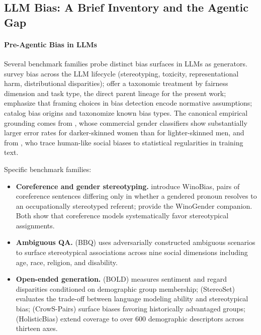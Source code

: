 \documentclass[acmsmall,nonacm]{acmart}
\begin{document}
\subsection{LLM Bias: A Brief Inventory and the Agentic Gap}

\paragraph{Pre-Agentic Bias in LLMs}

Several benchmark families probe distinct bias surfaces in LLMs as generators. \cite{gallegos2024bias} survey bias across the LLM lifecycle (stereotyping, toxicity, representational harm, distributional disparities); \cite{chu2024fairness} offer a taxonomic treatment by fairness dimension and task type, the direct parent lineage for the present work; \cite{blodgett2020language} emphasize that framing choices in bias detection encode normative assumptions; \cite{navigli2023biases} catalog bias origins and taxonomize known bias types. The canonical empirical grounding comes from \cite{buolamwini2018gender}, whose commercial gender classifiers show substantially larger error rates for darker-skinned women than for lighter-skinned men, and from \cite{caliskan2017semantics}, who trace human-like social biases to statistical regularities in training text.

Specific benchmark families:

\begin{itemize}
\item \textbf{Coreference and gender stereotyping.} \cite{zhao2018gender} introduce WinoBias, pairs of coreference sentences differing only in whether a gendered pronoun resolves to an occupationally stereotyped referent; \cite{rudinger2018gender} provide the WinoGender companion. Both show that coreference models systematically favor stereotypical assignments.
\end{itemize}

\begin{itemize}
\item \textbf{Ambiguous QA.} \cite{parrish2022bbq} (BBQ) uses adversarially constructed ambiguous scenarios to surface stereotypical associations across nine social dimensions including age, race, religion, and disability.
\end{itemize}

\begin{itemize}
\item \textbf{Open-ended generation.} \cite{dhamala2021bold} (BOLD) measures sentiment and regard disparities conditioned on demographic group membership; \cite{nadeem2021stereoset} (StereoSet) evaluates the trade-off between language modeling ability and stereotypical bias; \cite{nangia2020crows} (CrowS-Pairs) surface biases favoring historically advantaged groups; \cite{smith2022sorry} (HolisticBias) extend coverage to over 600 demographic descriptors across thirteen axes.
\end{itemize}
\end{document}
